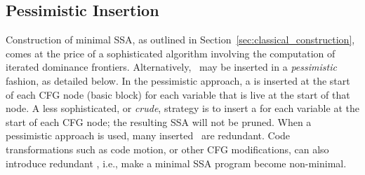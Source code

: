 {\subsection{Pessimistic \phifun Insertion}

Construction of minimal SSA, as outlined in Section~\ref{sec:classical_construction}, comes at the price of a sophisticated algorithm involving the computation of iterated dominance frontiers. 
Alternatively, \phifuns\ may be inserted in a \textit{pessimistic} fashion, as detailed below. In the pessimistic approach, a \phifun is inserted at the start of each CFG node (basic block) for each variable that is live at the start of that node. 
A less sophisticated, or \textit{crude}, strategy is to insert a \phifun for each variable at the start of each CFG node; 
the resulting SSA will not be pruned. 
When a pessimistic approach is used, many inserted \phifuns\ are redundant. 
Code transformations such as code motion, or other CFG modifications, can also introduce redundant \phifuns, i.e., make a minimal SSA program become non-minimal.

}
